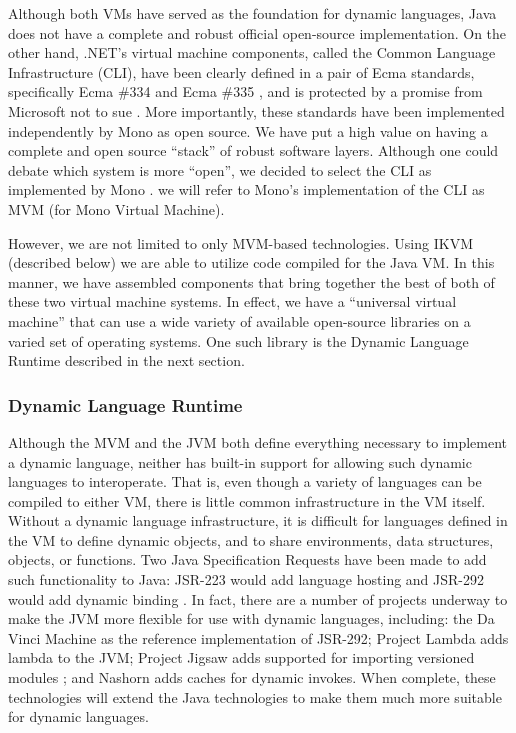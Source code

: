 \documentclass[preprint]{sigplanconf}
\begin{document}
Although both VMs have served as the foundation for dynamic languages,
Java does not have a complete and robust official open-source
implementation. On the other hand, .NET’s virtual machine components,
called the Common Language Infrastructure (CLI), have been clearly
defined in a pair of Ecma standards, specifically Ecma \#334 and Ecma
\#335 \cite{ecma-standards}, and is protected by a promise from
Microsoft not to sue \cite{microsoft-community-promise}. More
importantly, these standards have been implemented independently by
Mono as open source. We have put a high value on having a complete and
open source ``stack'' of robust software layers. Although one could
debate which system is more ``open'', we decided to select the CLI as
implemented by Mono \cite{mono}. we will refer to Mono's implementation of the CLI
as MVM (for Mono Virtual Machine).

However, we are not limited to only MVM-based technologies. Using IKVM
(described below) we are able to utilize code compiled for the Java
VM. In this manner, we have assembled components that bring together
the best of both of these two virtual machine systems. In effect, we
have a ``universal virtual machine'' that can use a wide variety of
available open-source libraries on a varied set of operating
systems. One such library is the Dynamic Language Runtime described in
the next section.

\subsubsection{Dynamic Language Runtime}

Although the MVM and the JVM both define everything necessary to
implement a dynamic language, neither has built-in support for
allowing such dynamic languages to interoperate. That is, even though
a variety of languages can be compiled to either VM, there is little
common infrastructure in the VM itself. Without a dynamic language
infrastructure, it is difficult for languages defined in the VM to
define dynamic objects, and to share environments, data structures,
objects, or functions. Two Java Specification Requests have been made
to add such functionality to Java: JSR-223 would add language hosting
and JSR-292 would add dynamic binding \cite{wu-2010}. In fact, there are a
number of projects underway to make the JVM more flexible for use with
dynamic languages, including: the Da Vinci Machine \cite{java-davinci}
as the reference implementation of JSR-292; Project Lambda
\cite{java-lambda} adds lambda to the JVM; Project Jigsaw adds
supported for importing versioned modules \cite{java-jigsaw}; and
Nashorn \cite{java-nashorn} adds caches for dynamic invokes. When
complete, these technologies will extend the Java technologies to make
them much more suitable for dynamic languages.
\end{document}
